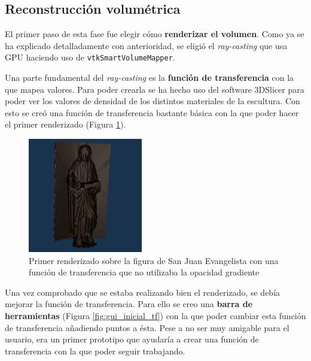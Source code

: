 \subsection{Reconstrucción volumétrica}

El primer paso de esta fase fue elegir cómo \textbf{renderizar el volumen}. Como ya se ha explicado detalladamente con anterioridad, se eligió el \textit{ray-casting} que usa GPU haciendo uso de \texttt{vtkSmartVolumeMapper}.

Una parte fundamental del \textit{ray-casting} es la \textbf{función de transferencia} con la que mapea valores. Para poder crearla se ha hecho uso del software 3DSlicer \cite{slicer} para poder ver los valores de densidad de los distintos materiales de la escultura. Con esto se creó una función de transferencia bastante básica con la que poder hacer el primer renderizado (Figura  \ref{fig:primer_renderizado}).

\begin{figure}[H]
	\centering
	\includegraphics[width=5cm]{imagenes/primer_renderizado}
	\caption{Primer renderizado sobre la figura de San Juan Evangelista con una función de transferencia que no utilizaba la opacidad gradiente}
	\label{fig:primer_renderizado}
\end{figure}

Una vez comprobado que se estaba realizando bien el renderizado, se debía mejorar la función de transferencia. Para ello se creo una \textbf{barra de herramientas} (Figura \ref{fig:gui_inicial_tf}) con la que poder cambiar esta función de transferencia añadiendo puntos a ésta. Pese a no ser muy amigable para el usuario, era un primer prototipo que ayudaría a crear una función de transferencia con la que poder seguir trabajando.

